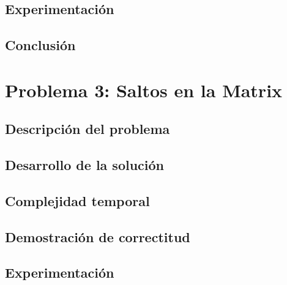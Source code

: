 \documentclass[a4paper, 10pt, twoside]{article}
\begin{document}
\subsection{Experimentación}
\label{problema2-experimentacion}


\subsection{Conclusión}
\label{problema2-resultados}


\newpage



\section{Problema 3: Saltos en la Matrix}

\subsection{Descripción del problema}
\label{problema3-descripcion}


\subsection{Desarrollo de la solución}
\label{problema3-desarrollo}


\subsection{Complejidad temporal}
\label{problema3-complejidad}


\subsection{Demostración de correctitud}
\label{problema3-demostracion}


\subsection{Experimentación}
\label{problema3-experimentacion}

\end{document}
